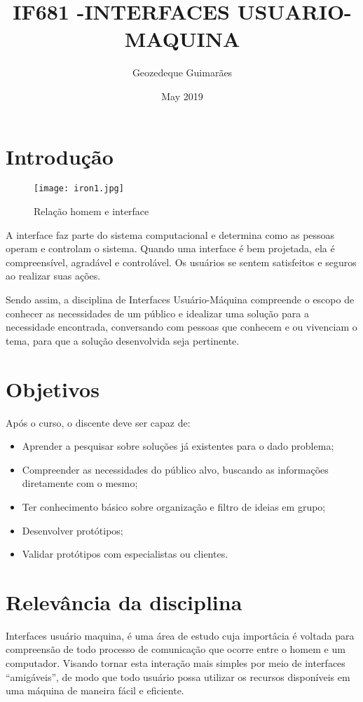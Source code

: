\documentclass[10pt]{article}
\title{IF681 -INTERFACES USUARIO-MAQUINA}
\author{ Geozedeque Guimarães}
\date{May 2019}
\begin{document}
\maketitle

\section{Introdução}

\begin{figure}[h!]
\centering
\texttt{[image: iron1.jpg]}
\caption{Relação homem e interface}\cite{Imagem}
\label{fig:Relação homem e interface}
\end{figure}

 A interface faz parte do sistema computacional e determina como as pessoas operam e controlam o sistema. Quando uma interface é bem projetada, ela é compreensível, agradável e controlável. Os usuários se sentem satisfeitos e seguros ao realizar suas ações.\cite{Introd}
 
 Sendo assim, a disciplina de Interfaces Usuário-Máquina compreende o escopo de conhecer as necessidades de um público e idealizar uma solução para a necessidade encontrada, conversando com pessoas que conhecem e ou vivenciam o tema, para que a solução desenvolvida seja pertinente.\cite{Introd1}

\section{Objetivos}\cite{Objetivo}
    Após o curso, o discente deve ser capaz de:

\begin{itemize}
  \item Aprender a pesquisar sobre soluções já existentes para o dado problema;
  \item Compreender as necessidades do público alvo, buscando as informações diretamente com o mesmo;
  \item Ter conhecimento básico sobre organização e filtro de ideias em grupo;
  \item Desenvolver protótipos;
  \item Validar protótipos com especialistas ou clientes.
\end{itemize}

\section{Relevância da disciplina}

Interfaces usuário maquina, é uma área de estudo cuja importâcia é voltada para compreensão de todo processo de comunicação que ocorre entre o homem e um computador. Visando tornar esta interação mais simples por meio de interfaces “amigáveis”, de modo que todo usuário possa utilizar os recursos disponíveis em uma máquina de maneira fácil e eficiente.\cite{Importancia}
\end{document}
